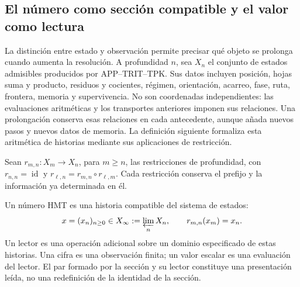 
\subsection{El número como sección compatible y el valor como lectura}
\label{hist:seccion}

La distinción entre estado y observación permite precisar qué objeto se
prolonga cuando aumenta la resolución. A profundidad \(n\), sea \(X_n\)
el conjunto de estados admisibles producidos por APP--TRIT--TPK. Sus datos
incluyen posición, hojas suma y producto, residuos y cocientes, régimen,
orientación, acarreo, fase, ruta, frontera, memoria y supervivencia. No son
coordenadas independientes: las evaluaciones aritméticas y los transportes
anteriores imponen sus relaciones. Una prolongación conserva esas relaciones
en cada antecedente, aunque añada nuevos pasos y nuevos datos de memoria.
La definición siguiente formaliza esta aritmética de historias mediante
sus aplicaciones de restricción.

Sean \(r_{m,n}:X_m\to X_n\), para \(m\geq n\), las restricciones de
profundidad, con \(r_{n,n}=\operatorname{id}\) y
\(r_{\ell,n}=r_{m,n}\circ r_{\ell,m}\). Cada restricción conserva el
prefijo y la información ya determinada en él.

\begin{definition}
Un número HMT es una historia compatible del sistema de estados:
\begin{equation}
 x=(x_n)_{n\geq0}\in X_\infty:=\varprojlim_n X_n,
 \qquad r_{m,n}(x_m)=x_n.
 \label{hist:limite-inverso}
\end{equation}
Un lector es una operación adicional sobre un dominio especificado de estas
historias. Una cifra es una observación finita; un valor escalar es una
evaluación del lector. El par formado por la sección y su lector constituye
una presentación leída, no una redefinición de la identidad de la sección.
\end{definition}

